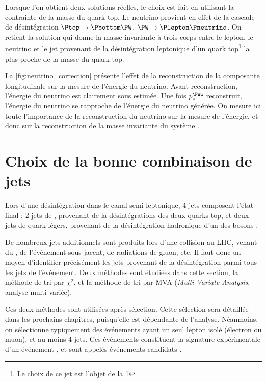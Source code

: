 Lorsque l'on obtient deux solutions réelles, le choix est fait en utilisant la contrainte de la masse du quark top. Le neutrino provient en effet de la cascade de désintégration $\Ptop \rightarrow \Pbottom \PW$, $\PW \rightarrow \Plepton \Pneutrino$. On retient la solution qui donne la masse invariante à trois corps entre le lepton, le neutrino et le jet \Pbottom provenant de la désintégration leptonique d'un quark top\footnote{Le choix de ce jet est l'objet de la \cref{sec:chi2}} la plus proche de la masse du quark top.

\medskip

La \cref{fig:neutrino_correction} présente l'effet de la reconstruction de la composante longitudinale sur la mesure de l'énergie du neutrino. Avant reconstruction, l'énergie du neutrino est clairement sous estimée. Une fois $p_z^{\Pnu}$ reconstruit, l'énergie du neutrino se rapproche de l'énergie du neutrino générée. On mesure ici toute l'importance de la reconstruction du neutrino sur la mesure de l'énergie, et donc sur la reconstruction de la masse invariante du système \ttbar.

\section{Choix de la bonne combinaison de jets} \label{sec:chi2}

Lors d'une désintégration \ttbar dans le canal semi-leptonique, 4 jets composent l'état final : 2 jets de \Pbottom, provenant de la désintégrations des deux quarks top, et deux jets de quark légers, provenant de la désintégration hadronique d'un des bosons \PW.

De nombreux jets additionnels sont produits lors d'une collision au LHC, venant du \pu, de l'événement sous-jacent, de radiations de gluon, etc. Il faut donc un moyen d'identifier précisément les jets provenant de la désintégration \ttbar parmi tous les jets de l'événement. Deux méthodes sont étudiées dans cette section, la méthode de tri par $\chi^2$, et la méthode de tri par MVA (\emph{Multi-Variate Analysis}, analyse multi-variée).

\medskip

Ces deux méthodes sont utilisées après sélection. Cette sélection sera détaillée dans les prochains chapitres, puisqu'elle est dépendante de l'analyse. Néanmoins, on sélectionne typiquement des événements ayant un seul lepton isolé (électron ou muon), et au moins 4 jets. Ces événements constituent la signature expérimentale d'un événement \ttbar, et sont appelés événements candidats \ttbar.

